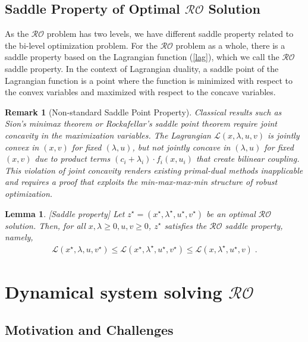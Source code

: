 \documentclass[journal,twoside,web]{ieeecolor}
\newcommand{\rev}[1]{\textcolor{revisionblue}{#1}}
\newtheorem{lemma}{Lemma}
\newtheorem{remark}{Remark}
\begin{document}
\subsection*{\rev{Saddle Property of Optimal $\mathcal{RO}$ Solution}}

As the $\mathcal{RO}$ problem has two levels, we have different saddle property related to the bi-level optimization problem. For the $\mathcal{RO}$ problem as a whole, there is a saddle property based on the Lagrangian function (\ref{lag}), which we call the $\mathcal{RO}$ saddle property. In the context of Lagrangian duality, a saddle point of the Lagrangian function is a point where the function is minimized with respect to the convex variables and maximized with respect to the concave variables.

\begin{remark}[\rev{Non-standard Saddle Point Property}]
Classical results such as Sion's minimax theorem \cite{sion1958} or Rockafellar's saddle point theorem \cite{rockafellar1970} require joint concavity in the maximization variables. The Lagrangian $\mathcal{L}(x,\lambda,u,v)$ is jointly convex in $(x,v)$ for fixed $(\lambda,u)$, but not jointly concave in $(\lambda,u)$ for fixed $(x,v)$ due to product terms $(c_i+\lambda_i) \cdot f_i(x,u_i)$ that create bilinear coupling. This violation of joint concavity renders existing primal-dual methods \cite{arrow1958,feijer2010} inapplicable and requires a proof that exploits the min-max-max-min structure of robust optimization.
\end{remark}

\begin{lemma} \label{saddle.lem} [Saddle property]
Let $z^\star=(x^\star,\lambda^\star,u^\star,v^\star)$ be an optimal $\mathcal{RO}$ solution. Then, for all $x,\lambda\geq 0,u,v\geq 0$\;, $z^\star$ satisfies the $\mathcal{RO}$ saddle property, namely,
\begin{align} \label{saddle}
\mathcal{L}(x^\star,\lambda,u,v^\star)\leq \mathcal{L}(x^\star,\lambda^\star,u^\star,v^\star)\leq \mathcal{L}(x,\lambda^\star,u^\star,v)\;.
\end{align}
\end{lemma}

\section{Dynamical system solving $\mathcal{RO}$} \label{section_pddynamics}

\subsection*{\rev{Motivation and Challenges}}
\end{document}
